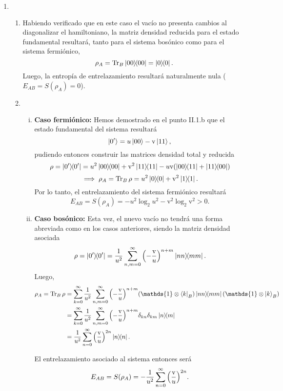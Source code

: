 \documentclass{scrartcl}
\newcommand{\inv}[1]{\frac{1}{#1}}
\DeclareRobustCommand{\[}{\begin{equation}}
\DeclareRobustCommand{\]}{\end{equation}}
\begin{document}
\begin{enumerate}
    
    
    \item \begin{enumerate}
        \item Habiendo verificado que en este caso el vacío no presenta cambios al diagonalizar el hamiltoniano, la matriz densidad reducida para el estado fundamental resultará, tanto para el sistema bosónico como para el sistema fermiónico,
        \[ \rho_A = \Tr_B \dyad{00}{00} = \dyad{0}{0}. \]
        Luego, la entropía de entrelazamiento resultará naturalmente nula ($E_{AB} = S(\rho_A) = 0$).
        
        
        \item \begin{enumerate}[(i)]
            \item \textbf{Caso fermiónico:} Hemos demostrado en el punto II.1.b que el estado fundamental del sistema resultará
            \[ \ket{0'} = u \ket{00} - \mathrm{v} \ket{11}, \]
            pudiendo entonces construir las matrices densidad total y reducida
            \[ \rho = \dyad{0'}{0'} = u^2 \dyad{00}{00} + \mathrm{v}^2 \dyad{11}{11} - u\mathrm{v} (\dyad{00}{11} + \dyad{11}{00}) \]
            \[ \implies \rho_A = \Tr_B \rho = u^2 \dyad{0}{0} + \mathrm{v}^2 \dyad{1}{1}. \]
            Por lo tanto, el entrelazamiento del sistema fermiónico resultará
            \[ E_{AB} = S(\rho_A) = - u^2 \log_2 u^2 - \mathrm{v}^2 \log_2 \mathrm{v}^2 > 0. \]
            
            
            \item \textbf{Caso bosónico:} Esta vez, el nuevo vacío no tendrá una forma abreviada como en los casos anteriores, siendo la matriz densidad asociada
            \[ \rho = \dyad{0'}{0'} = \inv{u^2} \sum_{n, m = 0}^\infty \qty(-\frac{\mathrm{v}}{u})^{n + m} \dyad{nn}{mm}. \]
            Luego,
            \begin{align}
                \rho_A = \Tr_B \rho &= \sum_{k = 0}^\infty \inv{u^2} \sum_{n, m = 0}^\infty \qty(-\frac{\mathrm{v}}{u})^{n + m} (\mathds{1} \otimes \bra{k}_B) \dyad{nn}{mm} (\mathds{1} \otimes \ket{k}_B) \\
                    &= \sum_{k = 0}^\infty \inv{u^2} \sum_{n, m = 0}^\infty \qty(-\frac{\mathrm{v}}{u})^{n + m} \delta_{kn} \delta_{km} \dyad{n}{m} \\
                    &= \inv{u^2} \sum_{n = 0}^\infty \qty(\frac{\mathrm{v}}{u})^{2n} \dyad{n}{n}.
            \end{align}
            
            El entrelazamiento asociado al sistema entonces será
            \[ E_{AB} = S(\rho_A) = - \inv{u^2} \sum_{n = 0}^\infty \qty(\frac{\mathrm{v}}{u})^{2n}. \]
            
            
        \end{enumerate}
    \end{enumerate}
    
\end{enumerate}

\end{document}
